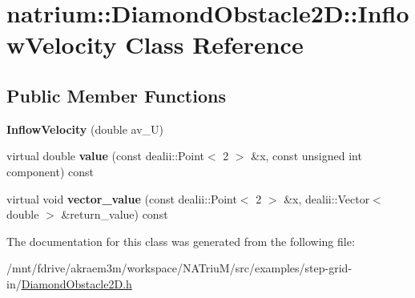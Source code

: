 \hypertarget{classnatrium_1_1DiamondObstacle2D_1_1InflowVelocity}{
\section{natrium::DiamondObstacle2D::InflowVelocity Class Reference}
\label{classnatrium_1_1DiamondObstacle2D_1_1InflowVelocity}
}
\subsection*{Public Member Functions}
\begin{DoxyCompactItemize}
\item 
\hypertarget{classnatrium_1_1DiamondObstacle2D_1_1InflowVelocity_a65841b3ee2192b38be169a91736d8a79}{
{\bfseries InflowVelocity} (double av\_\-U)}
\label{classnatrium_1_1DiamondObstacle2D_1_1InflowVelocity_a65841b3ee2192b38be169a91736d8a79}

\item 
\hypertarget{classnatrium_1_1DiamondObstacle2D_1_1InflowVelocity_ac8fc6efd472a8b72270e3a36fc9f27c8}{
virtual double {\bfseries value} (const dealii::Point$<$ 2 $>$ \&x, const unsigned int component) const }
\label{classnatrium_1_1DiamondObstacle2D_1_1InflowVelocity_ac8fc6efd472a8b72270e3a36fc9f27c8}

\item 
\hypertarget{classnatrium_1_1DiamondObstacle2D_1_1InflowVelocity_ada09c32209002ea4e32b9671b60b3a5d}{
virtual void {\bfseries vector\_\-value} (const dealii::Point$<$ 2 $>$ \&x, dealii::Vector$<$ double $>$ \&return\_\-value) const }
\label{classnatrium_1_1DiamondObstacle2D_1_1InflowVelocity_ada09c32209002ea4e32b9671b60b3a5d}

\end{DoxyCompactItemize}


The documentation for this class was generated from the following file:\begin{DoxyCompactItemize}
\item 
/mnt/fdrive/akraem3m/workspace/NATriuM/src/examples/step-\/grid-\/in/\hyperlink{DiamondObstacle2D_8h}{DiamondObstacle2D.h}\end{DoxyCompactItemize}
